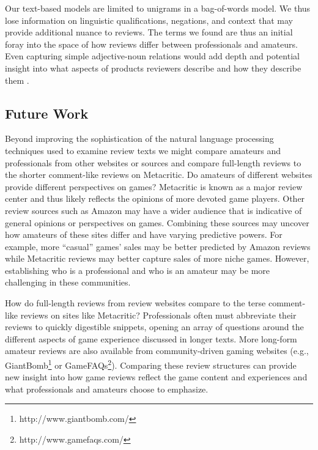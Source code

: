 \documentclass{sig-alternate}
\begin{document}
Our text-based models are limited to unigrams in a bag-of-words model.
We thus lose information on linguistic qualifications, negations, and
context that may provide additional nuance to reviews. The terms we
found are thus an initial foray into the space of how reviews differ
between professionals and amateurs. Even capturing simple adjective-noun
relations would add depth and potential insight into what aspects of
products reviewers describe and how they describe them \cite{zagal2011natural}.

\subsection{Future Work}
Beyond improving the sophistication of the
natural language processing techniques used to examine review texts we
might compare amateurs and professionals from other websites or sources and compare full-length reviews to the shorter comment-like reviews on Metacritic.
Do amateurs of different websites provide different perspectives on
games? Metacritic is known as a major review center and thus likely
reflects the opinions of more devoted game players. Other review sources
such as Amazon may have a wider audience that is indicative of general
opinions or perspectives on games. Combining these sources may uncover
how amateurs of these sites differ and have varying predictive powers.
For example, more ``casual'' games' sales may be better predicted by
Amazon reviews while Metacritic reviews may better capture sales of more
niche games. However, establishing who is a professional and who is an
amateur may be more challenging in these communities.

How do full-length reviews from review websites compare to the terse comment-like reviews on sites like Metacritic?
Professionals often must abbreviate their reviews to quickly digestible snippets, opening an array of questions around the different aspects of game experience discussed in longer texts.
More long-form amateur reviews are also available from community-driven gaming websites (e.g., GiantBomb\footnote{http://www.giantbomb.com/} or GameFAQs\footnote{http://www.gamefaqs.com/}).
Comparing these review structures can provide new insight into how game reviews reflect the game content and experiences and what professionals and amateurs choose to emphasize.


\end{document}
